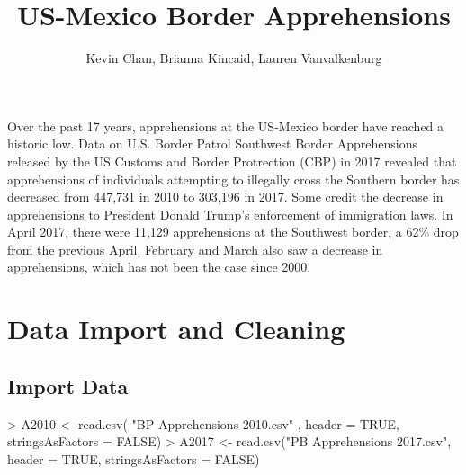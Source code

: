 \documentclass[letterpaper]{article}
\begin{document}


\title{US-Mexico Border Apprehensions}
\author{Kevin Chan, Brianna Kincaid, Lauren Vanvalkenburg}
\date{}
\maketitle

Over the past 17 years, apprehensions at the US-Mexico border have reached a historic low. Data on U.S. Border Patrol Southwest Border Apprehensions released by the US Customs and Border Protrection (CBP) in 2017 revealed that apprehensions of individuals attempting to illegally cross the Southern border has decreased from 447,731 in 2010 to 303,196 in 2017. Some credit the decrease in apprehensions to President Donald Trump's enforcement of immigration laws. In April 2017, there were 11,129 apprehensions at the Southwest border, a 62\% drop from the previous April. February and March also saw a decrease in apprehensions, which has not been the case since 2000. 

\section{Data Import and Cleaning}

\subsection{Import Data}
\begin{Schunk}
\begin{Sinput}
> A2010 <- read.csv( "BP Apprehensions 2010.csv" , header = TRUE, stringsAsFactors = FALSE)
> A2017 <- read.csv("PB Apprehensions 2017.csv", header = TRUE, stringsAsFactors = FALSE)
\end{Sinput}
\end{Schunk}
\end{document}
